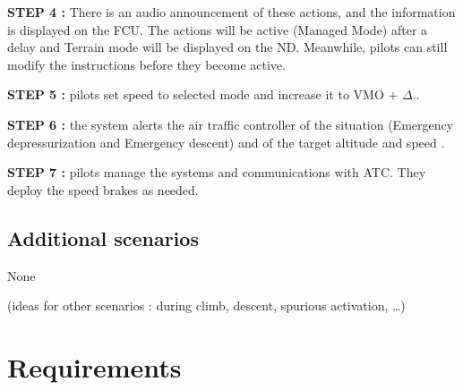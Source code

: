 \documentclass[12pt,oneside]{scrreprt}
\begin{document}
\textbf{STEP 4 :} There is an audio announcement of these actions,
and the information is displayed on the FCU. 
The actions will be active (Managed Mode) after a delay and Terrain mode will be displayed on the ND. Meanwhile, pilots can still modify the instructions before they become  active.

\textbf{STEP 5 :} pilots set speed to selected mode and increase it to VMO + $\Delta.$.

\textbf{STEP 6 :} the system alerts the air traffic controller of the situation (Emergency depressurization and Emergency descent) and of the target altitude and speed .

\textbf{STEP 7 :} pilots manage the systems and communications with ATC. They deploy
the speed brakes as needed.

\section{Additional scenarios}

None

(ideas for other scenarios : during climb, descent, spurious activation, …)

\chapter{Requirements}
\label{sec:reqs}


\newcommand{\EMERDES}[4]{%
\begin{tabular}{|p{\textwidth}|}
\hline
\textbf{EMER DES - #1} \\ \hline
#2 \\ \hline
\begin{tabular}{|p{3cm}|p{\dimexpr\textwidth-3cm-4\tabcolsep}|}
\hline
Rationale: & #3 \\ \hline
\end{tabular} \\ \hline
\begin{tabular}{|p{3cm}|p{\dimexpr\textwidth-3cm-4\tabcolsep}|}
\hline
Comments: & #4 \\ \hline
\end{tabular} \\ \hline
\end{tabular}
\vspace{0.5cm}
}
\end{document}
